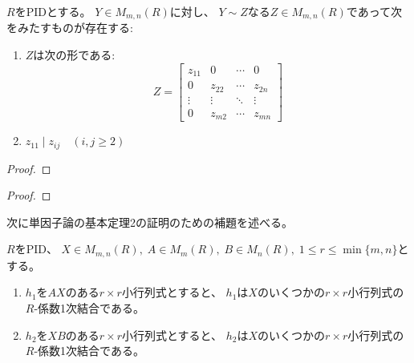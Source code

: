 \documentclass[report]{jlreq}
\begin{document}
\begin{lemma}
    $R$をPIDとする。
    $Y \in M_{m, n}(R)$に対し、
    $Y \sim Z$なる$Z \in M_{m, n}(R)$であって次をみたすものが存在する:
    \begin{enumerate}
        \item $Z$は次の形である:
            \begin{equation}
                Z = \begin{bmatrix}
                    z_{11} & 0 & \cdots & 0 \\
                    0 & z_{22} & \cdots & z_{2n} \\
                    \vdots & \vdots & \ddots & \vdots \\
                    0 & z_{m2} & \cdots & z_{mn}
                \end{bmatrix}
            \end{equation}
        \item $z_{11} \mid z_{ij} \quad (i, j \ge 2)$
    \end{enumerate}
\end{lemma}

\begin{proof}
    \TODO{}
\end{proof}


\begin{proof}
    \TODO{}
\end{proof}

次に単因子論の基本定理2の証明のための補題を述べる。

\begin{lemma}
    $R$をPID、
    $X \in M_{m, n}(R), \;
        A \in M_m(R), \;
        B \in M_n(R), \;
        1 \le r \le \min\{m, n\}$とする。
    \begin{enumerate}
        \item $h_1$を$AX$のある$r \times r$小行列式とすると、
            $h_1$は$X$のいくつかの$r \times r$小行列式の
            $R$-係数1次結合である。
        \item $h_2$を$XB$のある$r \times r$小行列式とすると、
            $h_2$は$X$のいくつかの$r \times r$小行列式の
            $R$-係数1次結合である。
    \end{enumerate}
\end{lemma}
\end{document}
